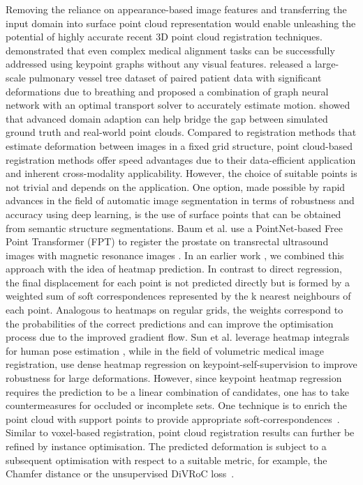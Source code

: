  Removing the reliance on appearance-based image features and transferring the input domain into surface point cloud representation would enable unleashing the potential of highly accurate recent 3D point cloud registration techniques. \citep{hansen2021deep} demonstrated that even complex medical alignment tasks can be successfully addressed using keypoint graphs without any visual features. \citep{shen2021accurate} released a large-scale pulmonary vessel tree dataset of paired patient data with significant deformations due to breathing and proposed a combination of graph neural network \citep{wu2020pointpwc} with an optimal transport solver to accurately estimate motion. \citep{bigalke2023denoised} showed that advanced domain adaption can help bridge the gap between simulated ground truth and real-world point clouds. Compared to registration methods that estimate deformation between images in a fixed grid structure, point cloud-based registration methods offer speed advantages due to their data-efficient application and inherent cross-modality applicability. However, the choice of suitable points is not trivial and depends on the application. One option, made possible by rapid advances in the field of automatic image segmentation in terms of robustness and accuracy using deep learning, is the use of surface points that can be obtained from semantic structure segmentations. Baum et al. use a PointNet-based Free Point Transformer (FPT) to register the prostate on transrectal ultrasound images with magnetic resonance images \citep{baum2021real}. In an earlier work \citep{hansen2021deep}, we combined this approach with the idea of heatmap prediction. In contrast to direct regression, the final displacement for each point is not predicted directly but is formed by a weighted sum of soft correspondences represented by the k nearest neighbours of each point. Analogous to heatmaps on regular grids, the weights correspond to the probabilities of the correct predictions and can improve the optimisation process due to the improved gradient flow. Sun et al. leverage heatmap integrals for human pose estimation \citep{sun2018integral}, while in the field of volumetric medical image registration, \citep{heinrich2022voxelmorphplusplus} use dense heatmap regression on keypoint-self-supervision to improve robustness for large deformations. However, since keypoint heatmap regression requires the prediction to be a linear combination of candidates, one has to take countermeasures for occluded or incomplete sets. One technique is to enrich the point cloud with support points to provide appropriate soft-correspondences~\citep{hermes2022support}. Similar to voxel-based registration, point cloud registration results can further be refined by instance optimisation. The predicted deformation is subject to a subsequent optimisation with respect to a suitable metric, for example, the Chamfer distance \citep{shen2021accurate} or the unsupervised DiVRoC loss~\citep{heinrich2023chasing}.

